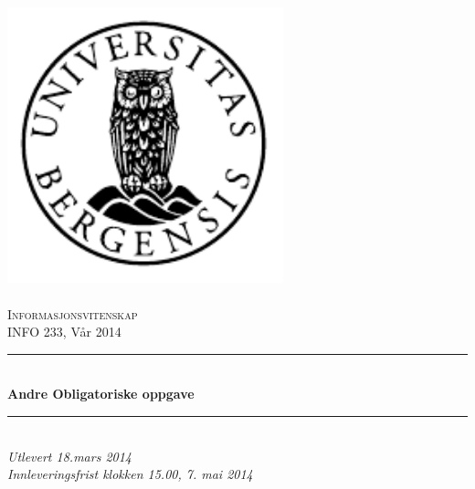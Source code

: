 \documentclass[norsk]{article}
\renewcommand{\maketitle}{}
\begin{document}
\maketitle

\newcommand{\blankpage}{\newpage{}\thispagestyle{empty}\mbox{}\newpage{}}
\newcommand{\HRule}{\rule{\linewidth}{0.5mm}}

\begin{titlepage}
\begin{center}
\includegraphics[width=8cm]{uib-emblem-svart} \\[0.5cm]
\paragraph*{}

\textsc{\Large Informasjonsvitenskap}\\[0.5cm]
\Large INFO 233, Vår 2014\\[0.4cm]
\HRule \\[0.4cm]
{ \huge \bfseries Andre Obligatoriske oppgave}\\[0.5cm]
\HRule \\[1.0cm]

{\large \emph{Utlevert 18.mars 2014}}\\
{\large \emph{Innleveringsfrist klokken 15.00, 7. mai 2014}}\\



\paragraph*{}
\end{center}
\vfill
\begin{center}
\end{center}
\end{titlepage}
\end{document}
